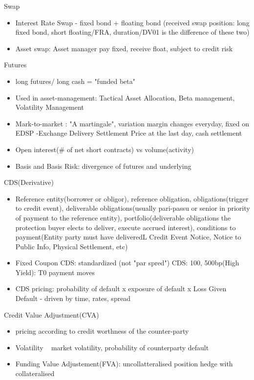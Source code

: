 \documentclass[11pt, openany]{book}              %
\begin{document}
Swap
\begin{itemize}
    \item Interest Rate Swap - fixed bond + floating bond (received swap position: long fixed bond, short floating/FRA, duration/DV01 is the difference of these two)
    \item Asset swap: Asset manager pay fixed, receive float, subject to credit risk
 \end{itemize}

Futures
\begin{itemize}
    \item long futures/ long cash = "funded beta"
     \item Used in asset-management: Tactical Asset Allocation, Beta management, Volatility Management
     \item Mark-to-market : "A martingale", variation margin changes everyday, fixed on EDSP -Exchange Delivery Settlement Price at the last day, cash settlement
     \item Open interest(\# of net short contracts) vs volume(activity)
     \item Basis and Basis Risk: divergence of futures and underlying
\end{itemize}

CDS(Derivative)
 \begin{itemize}
    \item Reference entity(borrower or obligor), reference obligation, obligations(trigger to credit event), deliverable obligations(usually pari-passu or senior in priority of payment to the reference entity), portfolio(deliverable obligations the protection buyer elects to deliver, execute accrued interest), conditions to payment(Entity party must have deliveredL Credit Event Notice, Notice to Public Info, Physical Settlement, etc)
    \item Fixed Coupon CDS: standardized (not "par spred") CDS: 100, 500bp(High Yield): T0 payment moves
    \item CDS pricing: probability of default x exposure of default x Loss Given Default  - driven by time, rates, spread
 \end{itemize}

Credit Value Adjustment(CVA)
 \begin{itemize}
    \item pricing according to credit worthness of the counter-party
    \item Volatility ~ market volatility, probability of counterparty default 
    \item Funding Value Adjustement(FVA): uncollatteralised position hedge with collateralised
    
\end{itemize}
\end{document}
